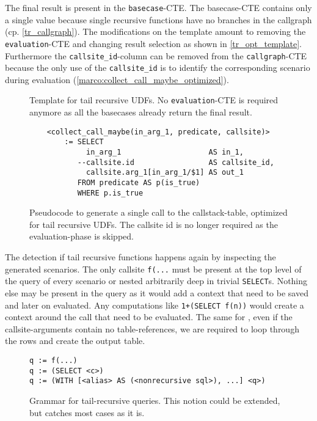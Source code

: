 The final result is present in the \texttt{basecase}-CTE. The basecase-CTE contains only a single value because single recursive functions have no branches in the callgraph (cp. \autoref{tr_callgraph}). The modifications on the template amount to removing the \texttt{evaluation}-CTE and changing result selection as shown in \autoref{tr_opt_template}. Furthermore the \texttt{callsite\_id}-column can be removed from the \texttt{callgraph}-CTE because the only use of the \texttt{callsite\_id} is to identify the corresponding scenario during evaluation (\autoref{marco:collect_call_maybe_optimized}).

\begin{figure}
    \centering
    \caption{Template for tail recursive UDFs. No \texttt{evaluation}-CTE is required anymore as all the basecases already return the final result.}
    \label{tr_opt_template}
\end{figure}


\begin{figure}[h!]\centering\small
    \begin{verbatim}
    <collect_call_maybe(in_arg_1, predicate, callsite)>
        := SELECT
             in_arg_1                    AS in_1, 
           --callsite.id                 AS callsite_id,
             callsite.arg_1[in_arg_1/$1] AS out_1
           FROM predicate AS p(is_true)
           WHERE p.is_true
    \end{verbatim}
  \caption{Pseudocode to generate a single call to the callstack-table, optimized for tail recursive UDFs. The callsite id is no longer required as the evaluation-phase is skipped.}
  \label{marco:collect_call_maybe_optimized}
\end{figure}

The detection if tail recursive functions happens again by inspecting the generated scenarios. The only callsite \texttt{f(...} must be present at the top level of the query of every scenario or nested arbitrarily deep in trivial \texttt{SELECT}s.
Nothing else may be present in the query as it would add a context that need to be saved and later on evaluated. Any computations like \texttt{1+(SELECT f(n))} would create a context around the call that need to be evaluated. The same for \FROM, even if the callsite-arguments contain no table-references, we are required to loop through the rows and create the output table.
\begin{figure}
    \centering
\begin{verbatim}
q := f(...)
q := (SELECT <c>)
q := (WITH [<alias> AS (<nonrecursive sql>), ...] <q>)
\end{verbatim}
    \caption{Grammar for tail-recursive queries. This notion could be extended, but catches most cases as it is.}
    \label{tr_grammar}
\end{figure}

